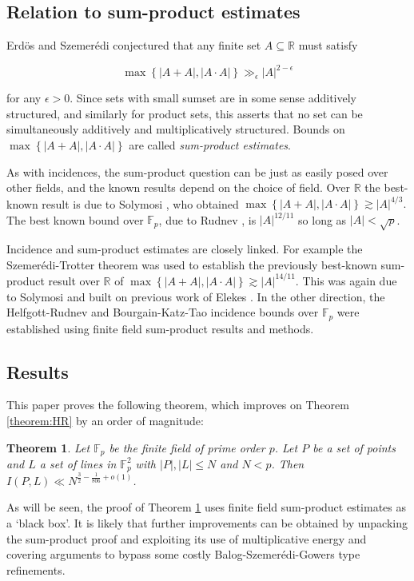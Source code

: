 \documentclass[12pt]{article}
\newtheorem{theorem}{Theorem}
\begin{document}
\subsection{Relation to sum-product estimates}

Erd\"os and Szemer\'edi conjectured that any finite set $A \subseteq \mathbb{R}$ must satisfy

$$\max\left\{|A+A|,|A\cdot A|\right\}\gg_{\epsilon} |A|^{2-\epsilon}$$

for any $\epsilon>0$. Since sets with small sumset are in some sense additively structured, and similarly for product sets, this asserts that no set can be simultaneously additively and multiplicatively structured. Bounds on $\max\left\{|A+A|,|A\cdot A|\right\}$ are called \textit{sum-product estimates}.

As with incidences, the sum-product question can be just as easily posed over other fields, and the known results depend on the choice of field. Over $\mathbb{R}$ the best-known result is due to Solymosi \cite{solymosi1}, who obtained 
$\max\left\{|A+A|,|A\cdot A|\right\}\gtrsim |A|^{4/3}.$
The best known bound over $\mathbb{F}_p$, due to Rudnev \cite{rudnev}, is $|A|^{12/11}$ so long as $|A|<\sqrt{p}$.

Incidence and sum-product estimates are closely linked. For example the Szemer\'edi-Trotter theorem was used to establish the previously best-known sum-product result over $\mathbb{R}$ of $\max\left\{|A+A|,|A\cdot A|\right\}\gtrsim |A|^{14/11}.$ This was again due to Solymosi \cite{solymosi2} and built on previous work of Elekes \cite{elekes}. In the other direction, the Helfgott-Rudnev and Bourgain-Katz-Tao incidence bounds over $\mathbb{F}_p$ were established using finite field sum-product results and methods.


\subsection{Results}
This paper proves the following theorem, which improves on Theorem \ref{theorem:HR} by an order of magnitude:

\begin{theorem}\label{theorem:result}
Let $\mathbb{F}_p$ be the finite field of prime order $p$. Let $P$ be a set of points and $L$ a set of lines in $\mathbb{F}_p^2$ with $|P|,|L|\leq N$ and $N<p$. Then $I(P,L)\ll N^{\frac{3}{2}-\frac{1}{806}+o(1)}$. 
\end{theorem}

As will be seen, the proof of Theorem \ref{theorem:result} uses finite field sum-product estimates as a `black box'. It is likely that further improvements can be obtained by unpacking the sum-product proof and exploiting its use of multiplicative energy and covering arguments to bypass some costly Balog-Szemer\'edi-Gowers type refinements. 
\end{document}
